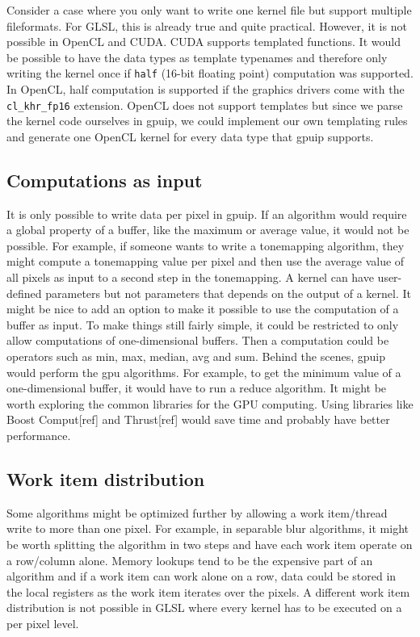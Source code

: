 Consider a case where you only want to write one kernel file but support multiple fileformats. For GLSL, this is already true and quite practical. However, it is not possible in OpenCL and CUDA. CUDA supports templated functions. It would be possible to have the data types as template typenames and therefore only writing the kernel once if {\tt half} (16-bit floating point) computation was supported. In OpenCL, half computation is supported if the graphics drivers come with the {\tt cl\_khr\_fp16} extension. OpenCL does not support templates but since we parse the kernel code ourselves in gpuip, we could implement our own templating rules and generate one OpenCL kernel for every data type that gpuip supports. 

\subsection{Computations as input}

It is only possible to write data per pixel in gpuip. If an algorithm would require a global property of a buffer, like the maximum or average value, it would not be possible. For example, if someone wants to write a tonemapping algorithm, they might compute a tonemapping value per pixel and then use the average value of all pixels as input to a second step in the tonemapping. A kernel can have user-defined parameters but not parameters that depends on the output of a kernel. It might be nice to add an option to make it possible to use the computation of a buffer as input. To make things still fairly simple, it could be restricted to only allow computations of one-dimensional buffers. Then a computation could be operators such as min, max, median, avg and sum. Behind the scenes, gpuip would perform the gpu algorithms. For example, to get the minimum value of a one-dimensional buffer, it would have to run a reduce algorithm. It might be worth exploring the common libraries for the GPU computing. Using libraries like Boost Comput[ref] and Thrust[ref] would save time and probably have better performance.

\subsection{Work item distribution}

Some algorithms might be optimized further by allowing a work item/thread write to more than one pixel. For example, in separable blur algorithms, it might be worth splitting the algorithm in two steps and have each work item operate on a row/column alone. Memory lookups tend to be the expensive part of an algorithm and if a work item can work alone on a row, data could be stored in the local registers as the work item iterates over the pixels. A different work item distribution is not possible in GLSL where every kernel has to be executed on a per pixel level.
